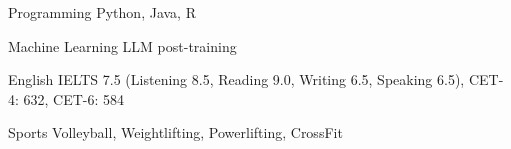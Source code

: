 

\begin{cvskills}

  \cvskill
    {Programming}
    {Python, Java, R}

  \cvskill
    {Machine Learning}
    {LLM post-training}

  \cvskill
    {English}
    {IELTS 7.5 (Listening 8.5, Reading 9.0, Writing 6.5, Speaking 6.5), CET-4: 632, CET-6: 584}

  \cvskill
    {Sports}
    {Volleyball, Weightlifting, Powerlifting, CrossFit}

\end{cvskills}
